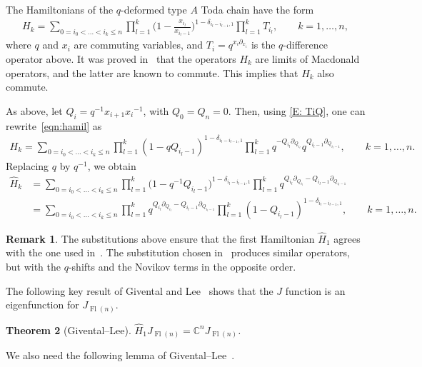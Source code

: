 \documentclass[11pt]{article}
\numberwithin{equation}{section}
\numberwithin{equation}{section}
\newtheorem{Theorem}{Theorem}[section]
\theoremstyle{definition}
\newtheorem{Remark}[Theorem]{Remark}
\DeclareMathOperator{\Fl}{Fl}
\begin{document}
The Hamiltonians of the $q$-deformed type $A$ Toda chain have the form
\begin{align}\label{eqn:hamil}
 H_k=\sum_{0= i_0<\dots<i_k\leq n} \prod_{l=1}^{k}\biggl(1-\frac{x_{i_l}}{x_{i_l-1}}\biggr)^{1-\delta_{i_l-i_{l-1},1}} \prod_{l=1}^{k} T_{i_l},\qquad k=1,\dots,n,
\end{align}
where $q$ and $x_i$ are commuting variables, and $T_i=q^{x_i\partial_{x_i}}$ is the $q$-difference operator above. It was proved in~\cite{gloI} that the operators $H_k$ are limits of Macdonald operators, and the latter are known to commute.
This implies that $H_k$ also commute.

As above, let $Q_i=q^{-1}{x_{i+1}}{x_i}^{-1}$, with $Q_0=Q_n=0$. Then, using
\eqref{E: TiQ}, one can rewrite~\eqref{eqn:hamil} as
\begin{align*}
 H_k=\sum_{0= i_0<\dots<i_k\leq n} \prod_{l=1}^{k}(1-qQ_{i_l-1})^{1-\delta_{i_l-i_{l-1},1}} \prod_{l=1}^{k} q^{-Q_{i_l}\partial_{Q_{i_l}}}q^{Q_{i_l-1}\partial_{Q_{i_l-1}}},\qquad k=1,\dots,n.
\end{align*}
Replacing $q$ by $q^{-1}$, we obtain
\begin{align*}%
 \widehat{H}_k&{}= \sum_{0= i_0<\dots<i_k\leq n}\prod_{l=1}^{k}\bigl(1-q^{-1}Q_{{i_l}-1}\bigr)^{1-\delta_{i_l-i_{l-1},1}} \prod_{l=1}^{k} q^{Q_{i_l}\partial_{Q_{i_l}}-Q_{i_l-1}\partial_{Q_{{i_l}-1}}}\\
 &{}=\sum_{0= i_0<\dots<i_k\leq n} \prod_{l=1}^{k} q^{Q_{i_l}\partial_{Q_{i_l}}-Q_{i_l-1}\partial_{Q_{{i_l}-1}}}\prod_{l=1}^{k}(1-Q_{{i_l}-1})^{1-\delta_{i_l-i_{l-1},1}}
 ,\qquad k=1,\dots,n .
 \end{align*}
\begin{Remark} The substitutions above
ensure that the first Hamiltonian $\widehat{H}_1$ agrees
with the one used in~\cite{givental_lee}. The substitution chosen in~\cite{act:2017}
produces similar
operators, but with the $q$-shifts and the Novikov terms in the opposite order.
\end{Remark}
The following key result of Givental and Lee~\cite[Theorem~2]{givental_lee} shows that the $J$ function is an eigenfunction for $J_{\Fl(n)}$.

\begin{Theorem}[Givental--Lee]\label{thm:GLeemain}
 $\widehat{H}_1J_{\Fl(n)}=\mathbb{C}^n J_{\Fl(n)}$.
\end{Theorem}

We also need the following lemma of Givental--Lee~\cite{givental_lee}.
\end{document}
